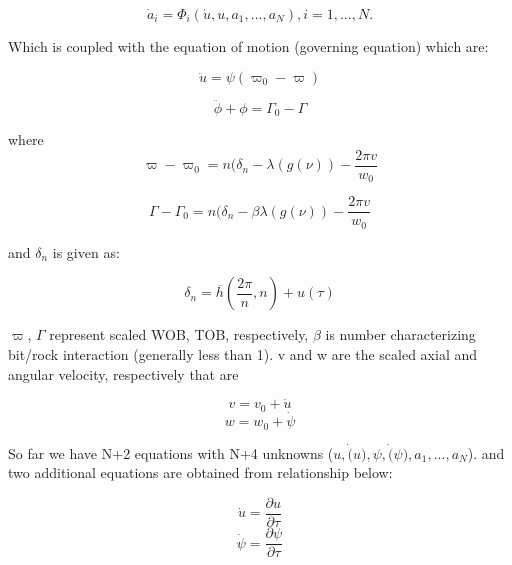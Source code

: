 \begin{equation}\label{Norder}
  \dot{a}_i = \Phi_i(\dot{u}, u, a_1, ..., a_N), i=1,...,N.
\end{equation}

Which is coupled with the equation of motion (governing equation) which are:

\begin{equation}\label{GE1_}
  \ddot{u} = \psi(\varpi_0 - \varpi)
\end{equation}

\begin{equation}\label{GE2_}
  \ddot{\phi} + \phi = \Gamma_0 - \Gamma
\end{equation}

where 
\begin{equation}\label{GE1}
  \varpi-\varpi_0 = n(\delta_n - \lambda(g(\nu)) - \frac{2\pi v}{w_0}
\end{equation}

\begin{equation}\label{GE2}
  \Gamma-\Gamma_0 = n(\delta_n -\beta \lambda(g(\nu)) - \frac{2\pi v}{w_0}
\end{equation}

and $\delta_n$ is given as:

\begin{equation}\label{deltan1}
  \delta_n = \overline{h}\left(\frac{2\pi}{n}, n\right) + u(\tau)
\end{equation}

$\varpi$, $\Gamma$ represent scaled WOB, TOB, respectively,  $\beta$ is number characterizing bit/rock interaction (generally less than 1). v and w are the scaled axial and angular velocity, respectively that are

\begin{equation}\label{scaled_axial_ve}
  v = v_0 + \dot{u}
\end{equation}
\begin{equation}\label{scaled_angular_vel}
  w = w_0 + \dot{\psi}
\end{equation}

So far we have N+2 equations with N+4 unknowns ($u, \dot(u), \psi, \dot(\psi), a_1, ..., a_N$). and two additional equations are obtained from relationship below:

\begin{equation}\label{axial_dis_vel}
  \dot{u} = \frac{\partial u}{\partial \tau}
\end{equation}
\begin{equation}\label{angular_dis_vel}
  \dot{\psi} = \frac{\partial \psi}{\partial \tau}
\end{equation}

